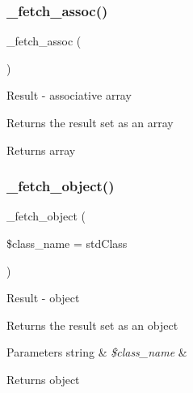 \subsubsection{\texorpdfstring{\+\_\+fetch\+\_\+assoc()}{\_fetch\_assoc()}}
{\footnotesize\ttfamily \+\_\+fetch\+\_\+assoc (\begin{DoxyParamCaption}{ }\end{DoxyParamCaption})\hspace{0.3cm}{\ttfamily [protected]}}

Result -\/ associative array

Returns the result set as an array

\begin{DoxyReturn}{Returns}
array 
\end{DoxyReturn}
\mbox{\label{class_c_i___d_b__oci8__result_a60806be6a9c2488820813c2a7f4fef71}} 
\subsubsection{\texorpdfstring{\+\_\+fetch\+\_\+object()}{\_fetch\_object()}}
{\footnotesize\ttfamily \+\_\+fetch\+\_\+object (\begin{DoxyParamCaption}\item[{}]{\$class\+\_\+name = {\ttfamily \textquotesingle{}stdClass\textquotesingle{}} }\end{DoxyParamCaption})\hspace{0.3cm}{\ttfamily [protected]}}

Result -\/ object

Returns the result set as an object


\begin{DoxyParams}[1]{Parameters}
string & {\em \$class\+\_\+name} & \\
\hline
\end{DoxyParams}
\begin{DoxyReturn}{Returns}
object 
\end{DoxyReturn}
\mbox{\label{class_c_i___d_b__oci8__result_a84bffd65e53902ade1591716749a33e3}} 
